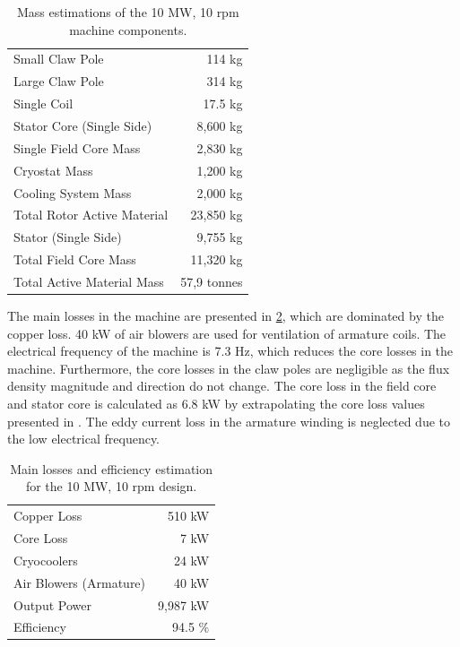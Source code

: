 \documentclass[12pt]{iopart}
\begin{document}
\begin{table}[]
  \centering
  \begin{tabular}{lr}
\hline
Small Claw Pole & 114 kg \\
Large Claw Pole & 314 kg \\
Single Coil & 17.5 kg \\
Stator Core (Single Side) & 8,600 kg \\
Single Field Core Mass & 2,830 kg \\
\hline
Cryostat Mass & 1,200 kg \\
Cooling System Mass & 2,000 kg \\
Total Rotor Active Material & 23,850 kg \\
Stator (Single Side) & 9,755 kg \\
Total Field Core Mass & 11,320 kg \\
\hline
Total Active Material Mass & 57,9 tonnes \\
\hline
 \end{tabular}
  \caption{Mass estimations of the 10 MW, 10 rpm machine components.}
  \label{10MW_mass_spec}
\end{table}

The main losses in the machine are presented in \ref{10MW_efficiency}, which are dominated by the copper loss. 40 kW of air blowers are used for ventilation of armature coils. 
The electrical frequency of the machine is 7.3 Hz, which reduces the core losses in the machine. Furthermore, the core losses in the claw poles are negligible as the flux density magnitude and direction do not change. The core loss in the field core and stator core is calculated as 6.8 kW by extrapolating the core loss values presented in \cite{vacoflux}. The eddy current loss in the armature winding is neglected due to the low electrical frequency.


\begin{table}[t]
  \centering
  \begin{tabular}{lr}
\hline
Copper Loss & 510 kW \\
Core Loss & 7 kW \\
Cryocoolers & 24 kW \\
Air Blowers (Armature) & 40 kW \\
Output Power & 9,987 kW \\
\hline
Efficiency & 94.5 \% \\
\hline
\end{tabular}
  \caption{Main losses and efficiency estimation for the 10 MW, 10 rpm design.}
  \label{10MW_efficiency}
\end{table}
\end{document}
